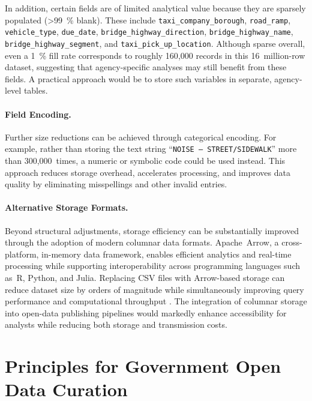 \documentclass[linenumber]{jdsart}
\begin{document}
In addition, certain fields are of limited analytical value because they are sparsely 
populated (\textgreater\SI{99}{\percent} blank). 
These include \texttt{taxi\_company\_borough}, \texttt{road\_ramp}, \texttt{vehicle\_type}, 
\texttt{due\_date}, \texttt{bridge\_highway\_direction}, \texttt{bridge\_highway\_name}, 
\texttt{bridge\_highway\_segment}, and \texttt{taxi\_pick\_up\_location}.  
Although sparse overall, even a \SI{1}{\percent} fill rate corresponds to 
roughly 160{,}000 records in this 16~million-row dataset, suggesting that 
agency-specific analyses may still benefit from these fields. 
A practical approach would be to store such variables in separate, 
agency-level tables.

\paragraph{Field Encoding.}  
Further size reductions can be achieved through categorical encoding. 
For example, rather than storing the text string 
``\texttt{NOISE~--~STREET/SIDEWALK}'' more than 300{,}000~times, 
a numeric or symbolic code could be used instead. 
This approach reduces storage overhead, accelerates processing, and 
improves data quality by eliminating misspellings and other invalid entries. 

\paragraph{Alternative Storage Formats.}  
Beyond structural adjustments, storage efficiency can be substantially improved 
through the adoption of modern columnar data formats. 
Apache~Arrow, a cross-platform, in-memory data framework, enables efficient analytics 
and real-time processing while supporting interoperability across programming languages 
such as~R, Python, and Julia. 
Replacing CSV files with Arrow-based storage can reduce dataset size by orders of magnitude 
while simultaneously improving query performance and computational throughput 
\citep{bates2024csv}.
The integration of columnar storage into open-data publishing pipelines would markedly 
enhance accessibility for analysts while reducing both storage and transmission costs.




\section{Principles for Government Open Data Curation}
\label{sec:principles}
\end{document}
